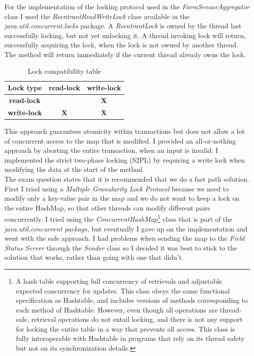 \documentclass{article}      %
\begin{document}
For the implementation of the locking protocol used in the \emph{FarmSensorAggregator} class I used the \emph{ReentrantReadWriteLock} class available in the \emph{java.util.concurrent.locks} package. A \emph{ReentrantLock} is owned by the thread last successfully locking, but not yet unlocking it. A thread invoking lock will return, successfully acquiring the lock, when the lock is not owned by another thread. The method will return immediately if the current thread already owns the lock. 
\begin{table}[h]
\begin{center}
\begin{tabular}{|c|c|c|}
\hline
{\bf{Lock type}} & \bf{read-lock} & \bf{write-lock} \\ \hline
\bf{read-lock} & \multicolumn{1}{l|}{} & \bf{X} \\ \hline
\bf{write-lock} & \bf{X} & \bf{X} \\ \hline
\end{tabular}
\caption{Lock compatibility table}
\label{Lock compatibility table}
\end{center}
\end{table}
This approach guarantees atomicity within transactions but does not allow a lot of concurrent access to the map that is modified. I provided an all-or-nothing approach by aborting the entire transaction, when an input is invalid. I implemented the strict two-phase locking (S2PL) by requiring a write lock when modifying the data at the start of the method. \\

The exam question states that it is recommended that we do a fast path solution. First I tried using a \emph{Multiple Granularity Lock Protocol} because we need to modify only a key-value pair in the map and we do not want to keep a lock on the entire HashMap, so that other threads can modify different pairs concurrently. I tried using the \emph{ConcurrentHashMap}\footnote{A hash table supporting full concurrency of retrievals and adjustable expected concurrency for updates. This class obeys the same functional specification as Hashtable, and includes versions of methods corresponding to each method of Hashtable. However, even though all operations are thread-safe, retrieval operations do not entail locking, and there is not any support for locking the entire table in a way that prevents all access. This class is fully interoperable with Hashtable in programs that rely on its thread safety but not on its synchronization details.} class that is part of the \emph{java.util.concurrent package}, but eventually I gave up on the implementation and went with the safe approach. I had problems when sending the map to the \emph{Field Status Server} through the \emph{Sender} class so I decided it was best to stick to the solution that works, rather than going with one that didn't.\\
\end{document}
